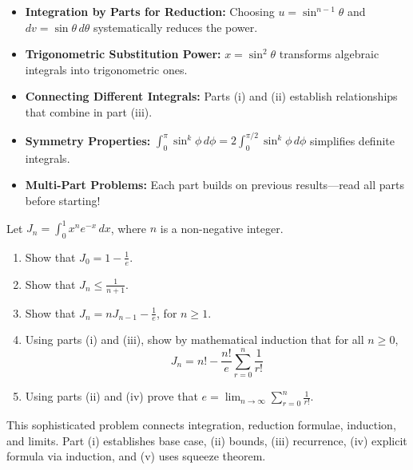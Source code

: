 \begin{takeaways}
\begin{itemize}
\item \textbf{Integration by Parts for Reduction:} Choosing $u = \sin^{n-1}\theta$ and $dv = \sin\theta \, d\theta$ systematically reduces the power.
\item \textbf{Trigonometric Substitution Power:} $x = \sin^2\theta$ transforms algebraic integrals into trigonometric ones.
\item \textbf{Connecting Different Integrals:} Parts (i) and (ii) establish relationships that combine in part (iii).
\item \textbf{Symmetry Properties:} $\int_0^{\pi} \sin^k\phi \, d\phi = 2\int_0^{\pi/2} \sin^k\phi \, d\phi$ simplifies definite integrals.
\item \textbf{Multi-Part Problems:} Each part builds on previous results---read all parts before starting!
\end{itemize}
\end{takeaways}

\vspace{1.5cm}


\begin{problem}
Let $J_n = \int_{0}^{1} x^n e^{-x} \, dx$, where $n$ is a non-negative integer.

\begin{enumerate}[label=(\roman*)]
\item Show that $J_0 = 1 - \frac{1}{e}$.
\item Show that $J_n \le \frac{1}{n+1}$.
\item Show that $J_n = n J_{n-1} - \frac{1}{e}$, for $n \ge 1$.
\item Using parts (i) and (iii), show by mathematical induction that for all $n \ge 0$,
\[
J_n = n! - \frac{n!}{e} \sum_{r=0}^{n} \frac{1}{r!}
\]
\item Using parts (ii) and (iv) prove that $e = \lim_{n \to \infty} \sum_{r=0}^{n} \frac{1}{r!}$.
\end{enumerate}
\end{problem}

\begin{hint}
This sophisticated problem connects integration, reduction formulae, induction, and limits. Part (i) establishes base case, (ii) bounds, (iii) recurrence, (iv) explicit formula via induction, and (v) uses squeeze theorem.
\end{hint}

